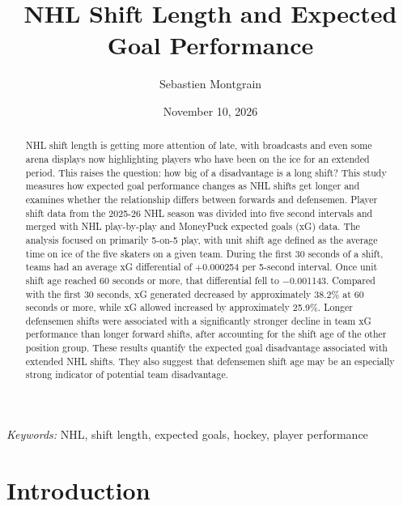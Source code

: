 \documentclass[
  12pt]{article}
\begin{document}
\def\spacingset#1{\renewcommand{\baselinestretch}%
{#1}\small\normalsize} \spacingset{1}



\date{November 10, 2026}
\title{\bf NHL Shift Length and Expected Goal Performance}
\author{
Sebastien Montgrain\\
}
\maketitle

\bigskip
\bigskip
\begin{abstract}
NHL shift length is getting more attention of late, with broadcasts and
even some arena displays now highlighting players who have been on the
ice for an extended period. This raises the question: how big of a
disadvantage is a long shift? This study measures how expected goal
performance changes as NHL shifts get longer and examines whether the
relationship differs between forwards and defensemen. Player shift data
from the 2025-26 NHL season was divided into five second intervals and
merged with NHL play-by-play and MoneyPuck expected goals (xG) data. The
analysis focused on primarily 5-on-5 play, with unit shift age defined
as the average time on ice of the five skaters on a given team. During
the first 30 seconds of a shift, teams had an average xG differential of
+0.000254 per 5-second interval. Once unit shift age reached 60 seconds
or more, that differential fell to −0.001143. Compared with the first 30
seconds, xG generated decreased by approximately 38.2\% at 60 seconds or
more, while xG allowed increased by approximately 25.9\%. Longer
defensemen shifts were associated with a significantly stronger decline
in team xG performance than longer forward shifts, after accounting for
the shift age of the other position group. These results quantify the
expected goal disadvantage associated with extended NHL shifts. They
also suggest that defensemen shift age may be an especially strong
indicator of potential team disadvantage.
\end{abstract}

\noindent%
{\it Keywords:} NHL, shift length, expected goals, hockey, player
performance
\vfill

\newpage
\spacingset{1.9} %


\section{Introduction}\label{introduction}
\end{document}
